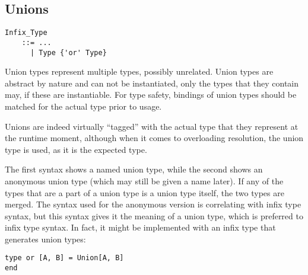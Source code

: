 \subsection{Unions}
\label{sec:unions}

\grammar\begin{lstlisting}
Infix_Type
    ::= ...
      | Type {'or' Type}
\end{lstlisting}

Union types represent multiple types, possibly unrelated. Union types are abstract by nature and can not be instantiated, only the types that they contain may, if these are instantiable. For type safety, bindings of union types should be matched for the actual type prior to usage. 

Unions are indeed virtually ``tagged'' with the actual type that they represent at the runtime moment, although when it comes to overloading resolution, the union type is used, as it is the expected type. 

The first syntax shows a named union type, while the second shows an anonymous union type (which may still be given a name later). If any of the types that are a part of a union type is a union type itself, the two types are merged. The syntax used for the anonymous version is correlating with infix type syntax, but this syntax gives it the meaning of a union type, which is preferred to infix type syntax. In fact, it might be implemented with an infix type that generates union types:

\begin{lstlisting}
type or [A, B] = Union[A, B] 
end
\end{lstlisting}

